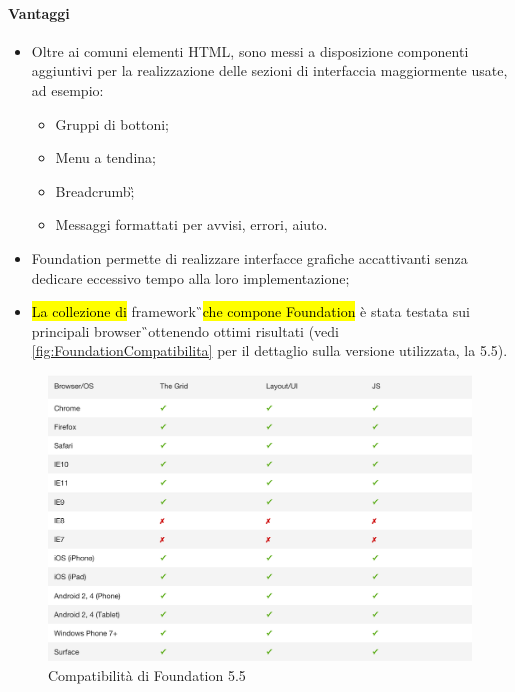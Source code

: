 \paragraph{Vantaggi}
	\begin{itemize}
		\item Oltre ai comuni elementi HTML, sono messi a disposizione componenti aggiuntivi per la realizzazione delle sezioni di interfaccia maggiormente usate, ad esempio: 
		\begin{itemize}
			\item Gruppi di bottoni;
			\item Menu a tendina;
			\item \gls{Breadcrumb}\G;
			\item Messaggi formattati per avvisi, errori, aiuto.
		\end{itemize}\item Foundation permette di realizzare interfacce grafiche accattivanti senza dedicare eccessivo tempo alla loro implementazione;
		\item \hl{La collezione di }\gls{framework}\G\ \hl{che compone Foundation} è stata testata sui principali \gls{browser}\G\ ottenendo ottimi risultati (vedi \autoref{fig:FoundationCompatibilita} per il dettaglio sulla versione utilizzata, la 5.5).
	\end{itemize}
	\begin{figure}[H]
		\begin{center}
			\includegraphics[width=15cm]{Pics/foundation5_compatibilita.png}
			\caption{Compatibilità di Foundation 5.5}
			\label{fig:FoundationCompatibilita}
		\end{center}
	\end{figure}

